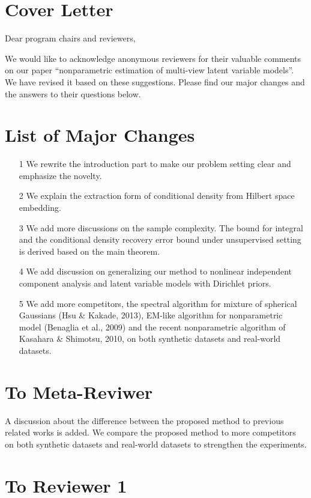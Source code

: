 \documentclass{article}
\begin{document}
\section*{Cover Letter}

Dear program chairs and reviewers,

We would like to acknowledge anonymous reviewers for their valuable comments on our paper ``nonparametric estimation of multi-view latent variable models''. We have revised it based on these suggestions. Please find our major changes and the answers to their questions below.


\section*{List of Major Changes}

\begin{itemize}
\item[1] We rewrite the introduction part to make our problem setting clear and emphasize the novelty.
\item[2] We explain the extraction form of conditional density from Hilbert space embedding.
\item[3] We add more discussions on the sample complexity. The bound for integral and the conditional density recovery error bound under unsupervised setting is derived based on the main theorem.
\item[4] We add discussion on generalizing our method to nonlinear independent component analysis and latent variable models with Dirichlet priors.
\item[5] We add more competitors, the spectral algorithm for mixture of spherical Gaussians (Hsu \& Kakade, 2013), EM-like algorithm for nonparametric model (Benaglia et al., 2009) and the recent nonparametric algorithm of Kasahara \& Shimotsu, 2010, on both synthetic datasets and real-world datasets.
\end{itemize}

\section*{To Meta-Reviwer}
A discussion about the difference between the proposed method to previous related works is added. We compare the proposed method to more competitors on both synthetic datasets and real-world datasets to strengthen the experiments.

\section*{To Reviewer 1}
\end{document}
